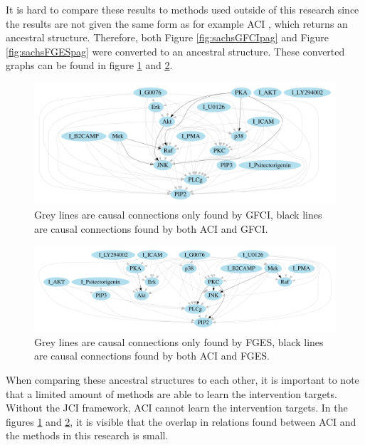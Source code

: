 \documentclass[a4paper,pdf]{article}
\begin{document}
It is hard to compare these results to methods used outside of this research since the results are not given the same form as for example ACI \cite{aci}, which returns an ancestral structure. Therefore, both Figure \ref{fig:sachsGFCIpag} and Figure \ref{fig:sachsFGESpag} were converted to an ancestral structure. These converted graphs can be found in figure \ref{fig:ACIvsGFCIpriorTRUE} and \ref{fig:ACIvsFGESpriorTRUE}. 


\begin{figure}[!ht]
    \centering
    \includegraphics[width=\textwidth]{ACIvsGFCIpriorTRUE}
    \caption{Grey lines are causal connections only found by GFCI, black lines are causal connections found by both ACI and GFCI.}
    \label{fig:ACIvsGFCIpriorTRUE}
\end{figure}
\begin{figure}[!ht]
    \centering
    \includegraphics[width=\textwidth]{ACIvsFGESpriorTRUE}
    \caption{Grey lines are causal connections only found by FGES, black lines are causal connections found by both ACI and FGES.}
    \label{fig:ACIvsFGESpriorTRUE}
\end{figure}

When comparing these ancestral structures to each other, it is important to note that a limited amount of methods are able to learn the intervention targets. Without the JCI framework, ACI cannot learn the intervention targets. In the figures \ref{fig:ACIvsGFCIpriorTRUE} and \ref{fig:ACIvsFGESpriorTRUE}, it is visible that the overlap in relations found between ACI and the methods in this research is small.
\end{document}
